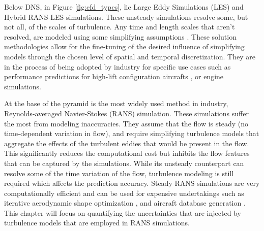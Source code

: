 Below DNS, in Figure \ref{fig:cfd_types}, lie Large Eddy Simulations (LES) and Hybrid RANS-LES simulations. These unsteady simulations resolve some, but not all, of the scales of turbulence. Any time and length scales that aren't resolved, are modeled using some simplifying assumptions \cite{pope_2000}. These solution methodologies allow for the fine-tuning of the desired influence of simplifying models through the chosen level of spatial and temporal discretization. They are in the process of being adopted by industry for specific use cases such as performance predictions for high-lift configuration aircrafts \cite{rumsey2019overview}, or engine simulations. 

At the base of the pyramid is the most widely used method in industry, Reynolds-averaged Navier-Stokes (RANS) simulation. These simulations suffer the most from modeling inaccuracies. They assume that the flow is steady (no time-dependent variation in flow), and require simplifying turbulence models that aggregate the effects of the turbulent eddies that would be present in the flow. This significantly reduces the computational cost but inhibits the flow features that can be captured by the simulations. While its unsteady counterpart can resolve some of the time variation of the flow, turbulence modeling is still required which affects the prediction accuracy. Steady RANS simulations are very computationally efficient and can be used for expensive undertakings such as iterative aerodynamic shape optimization \cite{lyu2015aerodynamic}, and aircraft database generation \cite{wendorff_combining_2016}. This chapter will focus on quantifying the uncertainties that are injected by turbulence models that are employed in RANS simulations. 